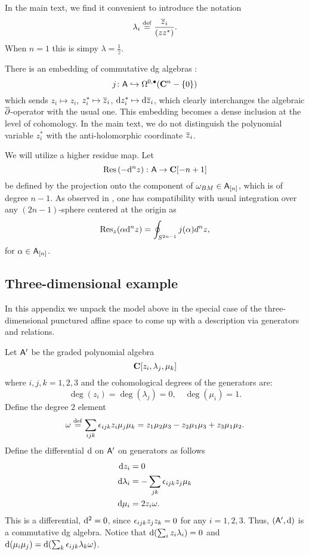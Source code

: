 \documentclass[11pt]{amsart}
\renewcommand{\op}{\operatorname}
\begin{document}
In the main text, we find it convenient to introduce the notation
\begin{equation}
\lambda_i \overset{\rm def}{=} \frac{{\overline{z}}_i}{(zz^*)} .
\end{equation}
When $n=1$ this is simpy $\lambda = \frac{1}{z}$. 

There is an embedding of commutative dg algebras \cite{FHK}:
\begin{equation}
j \colon \mathsf A \hookrightarrow \Omega^{0,\bullet}(\mathbf{C}^n - \{0\})
\end{equation}
which sends $z_i \mapsto z_i$, $z_i^* \mapsto {\overline{z}}_i$, ${\rm d} z^*_i \mapsto {\rm d} {\overline{z}}_i$, which clearly interchanges the algebraic $\overline{\partial}$-operator with the usual one.
This embedding becomes a dense inclusion at the level of cohomology.
In the main text, we do not distinguish the polynomial variable $z_i^*$ with the anti-holomorphic coordinate ${\overline{z}}_i$.

We will utilize a higher residue map.
Let 
\begin{equation}
\op{Res} \left(- \d^n z\right) \colon \sfA \to \C[-n+1]
\end{equation}
be defined by the projection onto the component of $\omega_{BM} \in \mathsf A_{[n]}$, which is of degree $n-1$.
As observed in \cite{FHK}, one has compatibility with usual integration over any $(2n-1)$-sphere centered at the origin as
\begin{equation}
{\rm Res}_z(\alpha {\rm d}^n z) = \oint_{S^{2n-1}} j(\alpha) d^n z ,
\end{equation}
for $\alpha \in \mathsf A_{[n]}$.

\subsection{Three-dimensional example}
In this appendix we unpack the model above in the special case of the three-dimensional punctured affine space to come up with a description via generators and relations.

Let $\mathsf A'$ be the graded polynomial algebra
\begin{equation}
\mathbf{C}[z_i, \lambda_j, \mu_k]
\end{equation}
where $i,j,k=1,2,3$ and the cohomological degrees of the generators are:
\begin{equation}
\op{deg}(z_i) = \op{deg}(\lambda_j) = 0, \quad \op{deg}(\mu_i) = 1 .
\end{equation}
Define the degree $2$ element
\begin{equation}
\omega \overset{\rm def}{=} \sum_{ijk} {\epsilon}_{ijk} z_i \mu_j \mu_k = z_1 \mu_2 \mu_3 - z_2 \mu_1 \mu_3 + z_3 \mu_1 \mu_2 .
\end{equation}
Define the differential ${\rm d}$ on $\mathsf A'$ on generators as follows
\begin{align*}
{\rm d} z_i & = 0 \\
{\rm d} \lambda_i & = - \sum_{jk} {\epsilon}_{ijk} z_j \mu_k \\
{\rm d} \mu_i & = 2 z_i \omega .
\end{align*}
This is a differential, ${\rm d}^2 = 0$, since ${\epsilon}_{ijk} z_j z_k = 0$ for any $i=1,2,3$.
Thus, $(\mathsf A', {\rm d})$ is a commutative dg algebra.
Notice that ${\rm d} (\sum_i z_i \lambda_i) = 0$ and ${\rm d} (\mu_i \mu_j) = {\rm d} (\sum_k {\epsilon}_{ijk} \lambda_k \omega)$.
\end{document}
